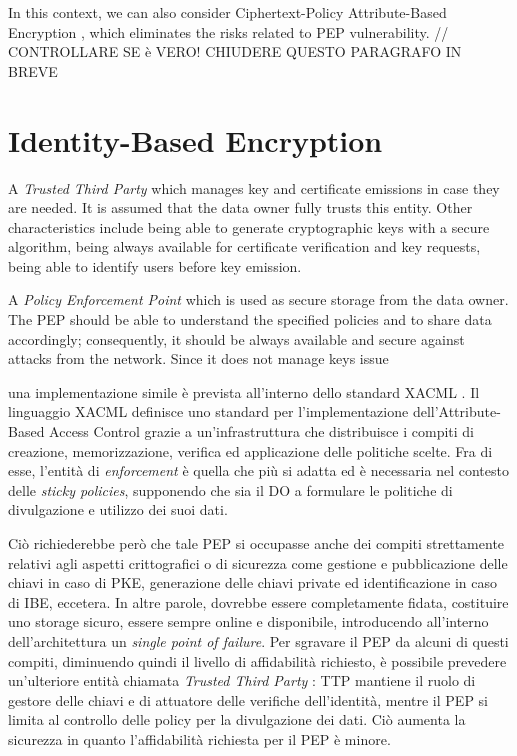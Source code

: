 In this context, we can also consider Ciphertext-Policy Attribute-Based Encryption \cite{Bethencourt2007Cyphertext}, which eliminates the risks related to PEP vulnerability.
// CONTROLLARE SE è VERO! CHIUDERE QUESTO PARAGRAFO IN BREVE

\section{Identity-Based Encryption}
 
A \textit{Trusted Third Party} which manages key and certificate emissions in case they are needed. It is assumed that the data owner fully trusts this entity. Other characteristics include being able to generate cryptographic keys with a secure algorithm, being always available for certificate verification and key requests, being able to identify users before key emission.

A \textit{Policy Enforcement Point} which is used as secure storage from the data owner. The PEP should be able to understand the specified policies and to share data accordingly; consequently, it should be always available and secure against attacks from the network. Since it does not manage keys issue




 una implementazione simile \`e prevista all’interno dello standard XACML \cite{standard2005extensible}. Il linguaggio XACML definisce uno standard per l’implementazione dell’Attribute-Based Access Control grazie a un'infrastruttura che distribuisce i compiti di creazione, memorizzazione, verifica ed applicazione delle politiche scelte. Fra di esse, l’entit\`a di \textit{enforcement} \`e quella che pi\`u si adatta ed \`e necessaria nel contesto delle \textit{sticky policies}, supponendo che sia il DO a formulare le politiche di divulgazione e utilizzo dei suoi dati. 

Ci\`o richiederebbe per\`o che tale PEP si occupasse anche dei compiti strettamente relativi agli aspetti crittografici o di sicurezza come gestione e pubblicazione delle chiavi in caso di PKE, generazione delle chiavi private ed identificazione in caso di IBE, eccetera. In altre parole, dovrebbe essere completamente fidata, costituire uno storage sicuro, essere sempre online e disponibile, introducendo all’interno dell’architettura un \textit{single point of failure}. Per sgravare il PEP da alcuni di questi compiti, diminuendo quindi il livello di affidabilità richiesto, è possibile prevedere un'ulteriore entit\`a chiamata \textit{Trusted Third Party} \cite{tang2008using}: TTP mantiene il ruolo di gestore delle chiavi e di attuatore delle verifiche dell’identit\`a, mentre il PEP si limita al controllo delle policy per la divulgazione dei dati. Ci\`o aumenta la sicurezza in quanto l’affidabilit\`a richiesta per il PEP \`e minore.

